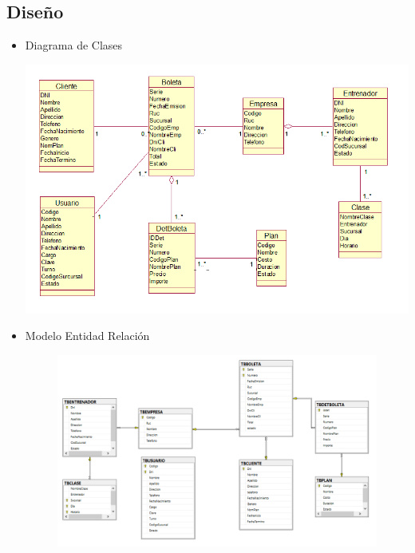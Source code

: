\subsection{Diseño}
\begin{itemize}
	\item Diagrama de Clases
\begin{center}
	\includegraphics[width=15cm]{./Imagenes/DiagramaClases}
\end{center}
	\item Modelo Entidad Relación
\begin{figure}[H]
		\begin{center}
			\includegraphics[width=15cm]{./Imagenes/MEntidadRelacion}
		\end{center}
	\end{figure}
\end{itemize}



